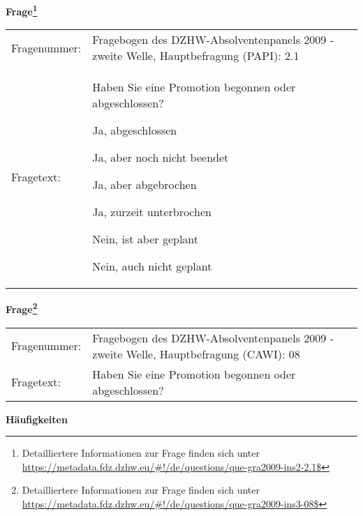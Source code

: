 				\vspace*{0.5cm}
                \noindent\textbf{Frage\footnote{Detailliertere Informationen zur Frage finden sich unter
		              \url{https://metadata.fdz.dzhw.eu/\#!/de/questions/que-gra2009-ins2-2.1$}}}\\
				\begin{tabularx}{\hsize}{@{}lX}
					Fragenummer: &
					  Fragebogen des DZHW-Absolventenpanels 2009 - zweite Welle, Hauptbefragung (PAPI):
					  2.1
 \\
					Fragetext: & Haben Sie eine Promotion begonnen oder abgeschlossen?\par  Ja, abgeschlossen\par  Ja, aber noch nicht beendet\par  Ja, aber abgebrochen\par  Ja, zurzeit unterbrochen\par  Nein, ist aber geplant\par  Nein, auch nicht geplant \\
				\end{tabularx}
				\vspace*{0.5cm}
                \noindent\textbf{Frage\footnote{Detailliertere Informationen zur Frage finden sich unter
		              \url{https://metadata.fdz.dzhw.eu/\#!/de/questions/que-gra2009-ins3-08$}}}\\
				\begin{tabularx}{\hsize}{@{}lX}
					Fragenummer: &
					  Fragebogen des DZHW-Absolventenpanels 2009 - zweite Welle, Hauptbefragung (CAWI):
					  08
 \\
					Fragetext: & Haben Sie eine Promotion begonnen oder abgeschlossen? \\
				\end{tabularx}





        		\vspace*{0.5cm}
                \noindent\textbf{Häufigkeiten}

